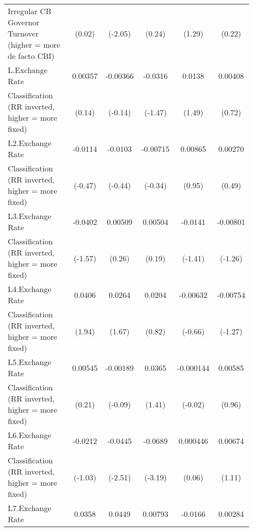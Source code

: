 {\begin{tabular}{l*{5}{c}}
Irregular CB Governor Turnover (higher = more de facto CBI)&      (0.02)         &     (-2.05)         &      (0.24)         &      (1.29)         &      (0.22)         \\
[1em]
L.Exchange Rate     &     0.00357         &    -0.00366         &     -0.0316         &      0.0138         &     0.00408         \\
Classification (RR inverted, higher = more fixed)&      (0.14)         &     (-0.14)         &     (-1.47)         &      (1.49)         &      (0.72)         \\
[1em]
L2.Exchange Rate    &     -0.0114         &     -0.0103         &    -0.00715         &     0.00865         &     0.00270         \\
Classification (RR inverted, higher = more fixed)&     (-0.47)         &     (-0.44)         &     (-0.34)         &      (0.95)         &      (0.49)         \\
[1em]
L3.Exchange Rate    &     -0.0402         &     0.00509         &     0.00504         &     -0.0141         &    -0.00801         \\
Classification (RR inverted, higher = more fixed)&     (-1.57)         &      (0.26)         &      (0.19)         &     (-1.41)         &     (-1.26)         \\
[1em]
L4.Exchange Rate    &      0.0406         &      0.0264         &      0.0204         &    -0.00632         &    -0.00754         \\
Classification (RR inverted, higher = more fixed)&      (1.94)         &      (1.67)         &      (0.82)         &     (-0.66)         &     (-1.27)         \\
[1em]
L5.Exchange Rate    &     0.00545         &    -0.00189         &      0.0365         &   -0.000144         &     0.00585         \\
Classification (RR inverted, higher = more fixed)&      (0.21)         &     (-0.09)         &      (1.41)         &     (-0.02)         &      (0.96)         \\
[1em]
L6.Exchange Rate    &     -0.0212         &     -0.0445\sym{*}  &     -0.0689\sym{**} &    0.000446         &     0.00674         \\
Classification (RR inverted, higher = more fixed)&     (-1.03)         &     (-2.51)         &     (-3.19)         &      (0.06)         &      (1.11)         \\
[1em]
L7.Exchange Rate    &      0.0358         &      0.0449\sym{*}  &     0.00793         &     -0.0166\sym{*}  &     0.00284         \\

\end{tabular}}
